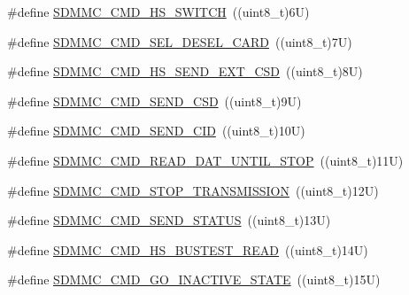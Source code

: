 \begin{DoxyCompactItemize}
\item 
\#define \mbox{\hyperlink{group___s_d_m_m_c___l_l___exported___constants_gaa1346f926841978186c11892055b946a}{S\+D\+M\+M\+C\+\_\+\+C\+M\+D\+\_\+\+H\+S\+\_\+\+S\+W\+I\+T\+CH}}~((uint8\+\_\+t)6\+U)
\item 
\#define \mbox{\hyperlink{group___s_d_m_m_c___l_l___exported___constants_ga48e588cd8f64c306298068da32f341fa}{S\+D\+M\+M\+C\+\_\+\+C\+M\+D\+\_\+\+S\+E\+L\+\_\+\+D\+E\+S\+E\+L\+\_\+\+C\+A\+RD}}~((uint8\+\_\+t)7\+U)
\item 
\#define \mbox{\hyperlink{group___s_d_m_m_c___l_l___exported___constants_ga68baff8efb174c2ddb918d6457cc1db6}{S\+D\+M\+M\+C\+\_\+\+C\+M\+D\+\_\+\+H\+S\+\_\+\+S\+E\+N\+D\+\_\+\+E\+X\+T\+\_\+\+C\+SD}}~((uint8\+\_\+t)8\+U)
\item 
\#define \mbox{\hyperlink{group___s_d_m_m_c___l_l___exported___constants_gafc91e60e9b247b1dc40a24b1f950d79c}{S\+D\+M\+M\+C\+\_\+\+C\+M\+D\+\_\+\+S\+E\+N\+D\+\_\+\+C\+SD}}~((uint8\+\_\+t)9\+U)
\item 
\#define \mbox{\hyperlink{group___s_d_m_m_c___l_l___exported___constants_ga0ea7c2b8e6cce142355d62173aa99a13}{S\+D\+M\+M\+C\+\_\+\+C\+M\+D\+\_\+\+S\+E\+N\+D\+\_\+\+C\+ID}}~((uint8\+\_\+t)10\+U)
\item 
\#define \mbox{\hyperlink{group___s_d_m_m_c___l_l___exported___constants_gacea75b46c20bf0251b4a185c5620307b}{S\+D\+M\+M\+C\+\_\+\+C\+M\+D\+\_\+\+R\+E\+A\+D\+\_\+\+D\+A\+T\+\_\+\+U\+N\+T\+I\+L\+\_\+\+S\+T\+OP}}~((uint8\+\_\+t)11\+U)
\item 
\#define \mbox{\hyperlink{group___s_d_m_m_c___l_l___exported___constants_ga386993a0917a4db76bd47065b9db4e3e}{S\+D\+M\+M\+C\+\_\+\+C\+M\+D\+\_\+\+S\+T\+O\+P\+\_\+\+T\+R\+A\+N\+S\+M\+I\+S\+S\+I\+ON}}~((uint8\+\_\+t)12\+U)
\item 
\#define \mbox{\hyperlink{group___s_d_m_m_c___l_l___exported___constants_ga6405c233945f18783d8765248aaaa134}{S\+D\+M\+M\+C\+\_\+\+C\+M\+D\+\_\+\+S\+E\+N\+D\+\_\+\+S\+T\+A\+T\+US}}~((uint8\+\_\+t)13\+U)
\item 
\#define \mbox{\hyperlink{group___s_d_m_m_c___l_l___exported___constants_gaf296fff01ce63412ac2c226950759db0}{S\+D\+M\+M\+C\+\_\+\+C\+M\+D\+\_\+\+H\+S\+\_\+\+B\+U\+S\+T\+E\+S\+T\+\_\+\+R\+E\+AD}}~((uint8\+\_\+t)14\+U)
\item 
\#define \mbox{\hyperlink{group___s_d_m_m_c___l_l___exported___constants_gad5ce7d24577c5e273269a656d465eaf5}{S\+D\+M\+M\+C\+\_\+\+C\+M\+D\+\_\+\+G\+O\+\_\+\+I\+N\+A\+C\+T\+I\+V\+E\+\_\+\+S\+T\+A\+TE}}~((uint8\+\_\+t)15\+U)
\item 

\end{DoxyCompactItemize}
